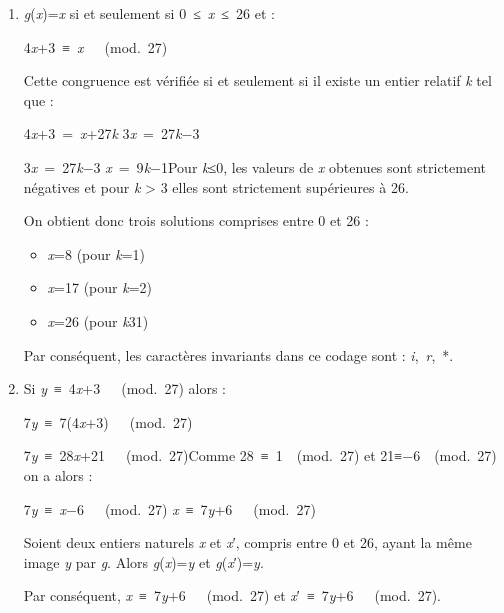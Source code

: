\begin{corrige}
     \begin{enumerate}
          \item
          \textit{g}(\textit{x})=\textit{x} si et seulement si 0 ≤ \textit{x} ≤ 26 et :
          \par
          4\textit{x}+3 ≡ \textit{x}   (mod. 27)
          \par
          Cette congruence est vérifiée si et seulement si il existe un entier relatif \textit{k} tel que :
          \par
          4\textit{x}+3 = \textit{x}+27\textit{k}
          3\textit{x} = 27\textit{k}−3
          \par
          3\textit{x} = 27\textit{k}−3
          \textit{x} = 9\textit{k}−1Pour \textit{k}≤0, les valeurs de \textit{x} obtenues sont strictement négatives et pour \textit{k} > 3 elles sont strictement supérieures à 26.
          \par
          On obtient donc trois solutions comprises entre 0 et 26 :
          \begin{itemize}
               \item
               \textit{x}=8 (pour \textit{k}=1)
               \item
               \textit{x}=17 (pour \textit{k}=2)
               \item
               \textit{x}=26 (pour \textit{k}31)
          \end{itemize}
          Par conséquent, les caractères invariants dans ce codage sont : \textit{i}, \textit{r}, *.
          \item
          Si \textit{y} ≡ 4\textit{x}+3   (mod. 27) alors :
          \par
          7\textit{y} ≡ 7(4\textit{x}+3)   (mod. 27)
          \par
          7\textit{y} ≡ 28\textit{x}+21   (mod. 27)Comme 28 ≡ 1  (mod. 27) et 21≡−6  (mod. 27) on a alors :
          \par
          7\textit{y} ≡ \textit{x}−6   (mod. 27)
          \textit{x} ≡ 7\textit{y}+6   (mod. 27)
          \par
          Soient deux entiers naturels \textit{x} et \textit{x}′, compris entre 0 et 26, ayant la même image \textit{y} par \textit{g}. Alors \textit{g}(\textit{x})=\textit{y} et \textit{g}(\textit{x}′)=\textit{y}.
          \par
          Par conséquent, \textit{x} ≡ 7\textit{y}+6   (mod. 27) et \textit{x}′ ≡ 7\textit{y}+6   (mod. 27).

\end{enumerate}
\end{corrige}
